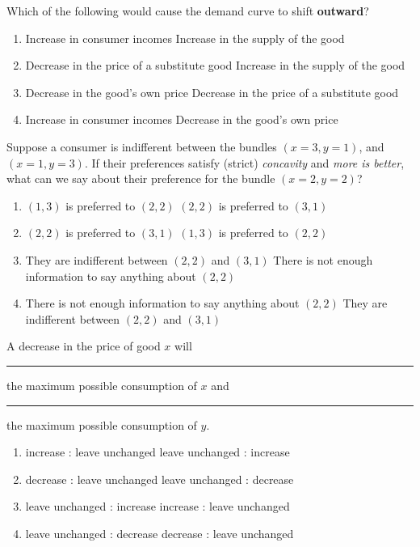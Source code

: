 \begin{question}[type=exam]{3}
  Which of the following would cause the demand curve to shift \textbf{outward}?
  \begin{enumerate}[label=\alph*), noitemsep]
    \item \vary
      {Increase in consumer incomes} %
      {Increase in the supply of the good}
    \item \vary
      {Decrease in the price of a substitute good}
      {Increase in the supply of the good}
    \item \vary
      {Decrease in the good's own price}
      {Decrease in the price of a substitute good}
    \item \vary
      {Increase in consumer incomes} %
      {Decrease in the good's own price}
  \end{enumerate}
\end{question}

\begin{question}[type=exam]{3}
  Suppose a consumer is indifferent between the bundles $(x=3,y=1)$, and $(x=1,y=3)$.
  If their preferences satisfy (strict) \textit{concavity} and \textit{more is better}, 
  what can we say about their preference for the bundle $(x=2,y=2)$?
  \begin{enumerate}[label=\alph*), noitemsep]
    \item \vary
      {$(1,3)$ is preferred to $(2,2)$}
      {$(2,2)$ is preferred to $(3,1)$} %
    \item \vary
      {$(2,2)$ is preferred to $(3,1)$} %
      {$(1,3)$ is preferred to $(2,2)$}
    \item \vary
      {They are indifferent between $(2,2)$ and $(3,1)$}
      {There is not enough information to say anything about $(2,2)$}
    \item \vary
      {There is not enough information to say anything about $(2,2)$}
      {They are indifferent between $(2,2)$ and $(3,1)$}
  \end{enumerate}
\end{question}

\begin{question}[type=exam]{3}
  A decrease in the price of good $x$ will \rule{1cm}{0.15mm} the maximum possible consumption of $x$
  and \rule{1cm}{0.15mm} the maximum possible consumption of $y$.
  \begin{enumerate}[label=\alph*), noitemsep]
    \item \vary
      {increase : leave unchanged} %
      {leave unchanged : increase}
    \item \vary
      {decrease : leave unchanged}
      {leave unchanged : decrease}
    \item \vary
      {leave unchanged : increase}
      {increase : leave unchanged} %
    \item \vary
      {leave unchanged : decrease}
      {decrease : leave unchanged}
  \end{enumerate}
\end{question}

